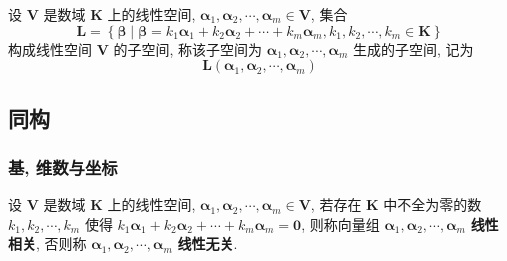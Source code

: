 \documentclass{article}
\begin{document}
\begin{itemize}
						设 $\boldsymbol V$ 是数域 $\boldsymbol K$ 上的线性空间, $\boldsymbol{\alpha}_{1}, \boldsymbol{\alpha}_{2}, \cdots, \boldsymbol{\alpha}_{m} \in \boldsymbol V$, 集合
						$$
						\boldsymbol L=\left\{\boldsymbol{\beta} \mid \boldsymbol{\beta}=k_{1} \boldsymbol{\alpha}_{1}+k_{2} 		\boldsymbol{\alpha}_{2}+\cdots+k_{m} \boldsymbol{\alpha}_{m}, k_{1}, k_{2}, \cdots, k_{m} \in \boldsymbol K\right\}
						$$
						构成线性空间 $\boldsymbol V$ 的子空间, 称该子空间为 $\boldsymbol{\alpha}_{1}, \boldsymbol{\alpha}_{2}, \cdots, \boldsymbol{\alpha}_{m}$ 生成的子空间, 记为
						$$
						\boldsymbol L\left(\boldsymbol{\alpha}_{1}, \boldsymbol{\alpha}_{2}, \cdots, \boldsymbol{\alpha}_{m}\right)
						$$
					\end{itemize}
		\subsection{同构}
			\subsubsection{基, 维数与坐标}
				设 $\boldsymbol V$ 是数域 $\boldsymbol K$ 上的线性空间, $\boldsymbol{\alpha}_{1}, \boldsymbol{\alpha}_{2}, \cdots, \boldsymbol{\alpha}_{m} \in \boldsymbol V$, 若存在 $\boldsymbol K$ 中不全为零的数 $k_{1}, k_{2}, \cdots, k_{m}$ 使得 $k_{1} \boldsymbol{\alpha}_{1}+k_{2} \boldsymbol{\alpha}_{2}+\cdots+k_{m} \boldsymbol{\alpha}_{m}=\mathbf{0}$, 则称向量组 $\boldsymbol{\alpha}_{1}, \boldsymbol{\alpha}_{2}, \cdots, \boldsymbol{\alpha}_{m}$ \textbf{线性相关}, 否则称 $\boldsymbol{\alpha}_{1}, \boldsymbol{\alpha}_{2}, \cdots, \boldsymbol{\alpha}_{m}$ \textbf{线性无关}.
\end{document}
